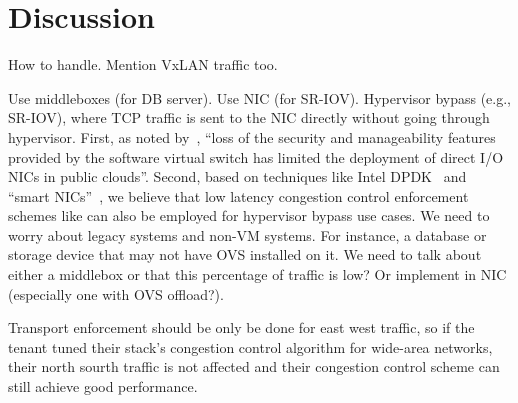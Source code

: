 \section{Discussion}
\label{discuss}

 How to handle. 
Mention VxLAN traffic too.

Use middleboxes (for DB server).
Use NIC (for SR-IOV).
Hypervisor bypass (e.g., SR-IOV), where TCP traffic is sent to the NIC directly without 
going through hypervisor. First, as noted by~\cite{shieh2011sharing}, ``loss of the security and 
manageability features provided by the software virtual switch has limited 
the deployment of direct I/O NICs in public clouds''. Second, based on techniques like Intel 
DPDK~\cite{intel-dpdk} and ``smart NICs''~\cite{cavium-nic,netronome-nic}, we believe that low latency 
congestion control enforcement schemes like \acdc{} can also be 
employed for hypervisor bypass use cases.
We need to worry about legacy systems and non-VM systems. For instance, a database or storage device that may not have OVS installed on it.
We need to talk about either a middlebox or that this percentage of traffic is low? Or implement in NIC (especially one with OVS offload?).

Transport enforcement should be only be done for east west traffic, so if the tenant tuned their stack's
congestion control algorithm for wide-area networks, their north sourth traffic is not affected and their 
congestion control scheme can still achieve good performance.


